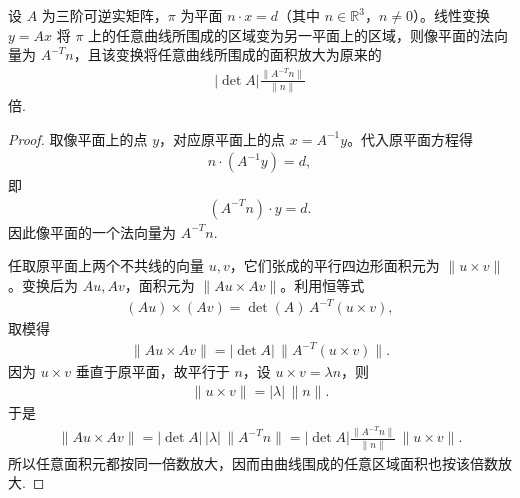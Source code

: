 \documentclass[../../main.tex]{subfiles}%
\begin{document}
\begin{proposition}\label{proposition:线性变换放大空间平面面积}
设 $A$ 为三阶可逆实矩阵，$\pi$ 为平面 $n\cdot x=d$（其中 $n\in\mathbb R^3$，$n\neq 0$）。线性变换 $y=Ax$ 将 $\pi$ 上的任意曲线所围成的区域变为另一平面上的区域，则像平面的法向量为 $A^{-T}n$，且该变换将任意曲线所围成的面积放大为原来的
\begin{align*}
|\det A|\frac{\|A^{-T}n\|}{\|n\|}
\end{align*}
倍.
\end{proposition}
\begin{proof}
取像平面上的点 $y$，对应原平面上的点 $x=A^{-1}y$。代入原平面方程得
\begin{align*}
n\cdot (A^{-1}y)=d,
\end{align*}
即
\begin{align*}
(A^{-T}n)\cdot y=d.
\end{align*}
因此像平面的一个法向量为 $A^{-T}n$.

任取原平面上两个不共线的向量 $u,v$，它们张成的平行四边形面积元为 $\|u\times v\|$。变换后为 $Au,Av$，面积元为 $\|Au\times Av\|$。利用恒等式
\begin{align*}
(Au)\times (Av)=\det(A)\,A^{-T}(u\times v),
\end{align*}
取模得
\begin{align*}
\|Au\times Av\|=|\det A|\,\|A^{-T}(u\times v)\|.
\end{align*}
因为 $u\times v$ 垂直于原平面，故平行于 $n$，设 $u\times v=\lambda n$，则
\begin{align*}
\|u\times v\|=|\lambda|\,\|n\|.
\end{align*}
于是
\begin{align*}
\|Au\times Av\|
=|\det A|\,|\lambda|\,\|A^{-T}n\|
=|\det A|\frac{\|A^{-T}n\|}{\|n\|}\,\|u\times v\|.
\end{align*}
所以任意面积元都按同一倍数放大，因而由曲线围成的任意区域面积也按该倍数放大.
\end{proof}
\end{document}
